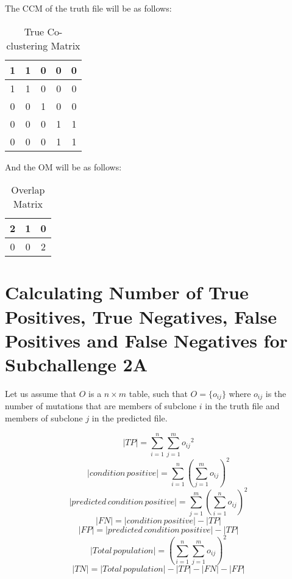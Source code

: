 \documentclass[a4paper, 11pt]{article}
\begin{document}
The CCM of the truth file will be as follows:

\begin{center}
    \begin{table}[ht]
    \centering
    \begin{tabular}{||c c c c c||}
    \hline
    1 & 1 & 0 & 0 & 0\\
    \hline
    1 & 1 & 0 & 0 & 0\\
    \hline
    0 & 0 & 1 & 0 & 0\\
    \hline
    0 & 0 & 0 & 1 & 1\\
    \hline
    0 & 0 & 0 & 1 & 1\\
    \hline
    \end{tabular}
    \caption{True Co-clustering Matrix}
    \label{table:ccm_true}    
    \end{table}
\end{center}

And the OM will be as follows:

\begin{center}
    \begin{table}[ht]
    \centering
    \begin{tabular}{||c c c||}
    \hline
    2 & 1 & 0\\
    \hline
    0 & 0 & 2\\
    \hline
    \end{tabular}
    \caption{Overlap Matrix}
    \label{table:om}
    \end{table}
\end{center}

\section*{Calculating Number of True Positives, True Negatives, False Positives and False Negatives for Subchallenge 2A}

Let us assume that $O$ is a $n \times m$ table, such that $O = \{o_{ij}\}$ where $o_{ij}$ is the number of mutations that are members of subclone $i$ in the truth file and members of subclone $j$ in the predicted file.

$$|TP| = \sum_{i=1}^{n} \sum_{j=1}^{m} {o_{ij}}^2$$ 
$$|condition\, positive| = \sum_{i=1}^{n} (\sum_{j=1}^{m} {o_{ij}} )^2$$ 
$$|predicted\, condition\, positive| = \sum_{j=1}^{m} (\sum_{i=1}^{n} {o_{ij}} )^2$$ 
$$|FN| = |condition\,positive| - |TP|$$
$$|FP| = |predicted\,condition\,positive| - |TP|$$
$$|Total\, population| = (\sum_{i=1}^{n} \sum_{j=1}^{m} o_{ij})^2$$ 
$$|TN| = |Total\, population| - |TP| - |FN| - |FP|$$
\end{document}
